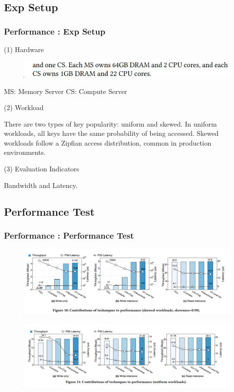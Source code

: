 \documentclass[11pt]{beamer}                                                                                                   %
\begin{document}
\subsection{Exp Setup}
\begin{frame}[t]
	\frametitle{Performance : Exp Setup}
	(1) Hardware
	\begin{figure}
		\centering
		\includegraphics[width=1.0\linewidth]{12}
	
	\end{figure}
	MS: Memory Server
	CS: Compute Server 
	
	
	(2) Workload
	
	
	There are two types of key popularity: uniform and skewed. In uniform workloads, all keys have the same probability of being accessed. Skewed workloads follow a Zipfian access distribution, common in production environments.
	
	(3) Evaluation Indicators
	
	
	Bandwidth and Latency.
\end{frame}

\subsection{Performance Test}
\begin{frame}[t]
	\frametitle{Performance : Performance Test}
	\begin{figure}
		\centering
		\includegraphics[width=0.9\linewidth]{13}
		
	\end{figure}
	\begin{figure}
		\centering
		\includegraphics[width=0.9\linewidth]{14}
	\end{figure}
	
\end{frame}
\end{document}
